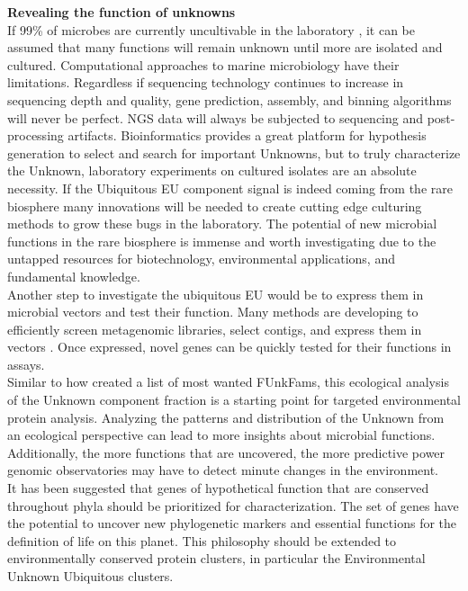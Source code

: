 \textbf{Revealing the function of unknowns}\\

If 99\% of microbes are currently uncultivable in the laboratory \citep{Barer_2015}, it can be assumed that many functions will remain unknown until more are isolated and cultured. Computational approaches to marine microbiology have their limitations. Regardless if sequencing technology continues to increase in sequencing depth and quality, gene prediction, assembly, and binning algorithms will never be perfect. NGS data will always be subjected to sequencing and post-processing artifacts. Bioinformatics provides a great platform for hypothesis generation to select and search for important Unknowns, but to truly characterize the Unknown, laboratory experiments on cultured isolates are an absolute necessity. If the Ubiquitous EU component signal is indeed coming from the rare biosphere many innovations will be needed to create cutting edge culturing methods to grow these bugs in the laboratory. The potential of new microbial functions in the rare biosphere is immense and worth investigating due to the untapped resources for biotechnology, environmental applications, and fundamental knowledge. \\

Another step to investigate the ubiquitous EU would be to express them in microbial vectors and test their function. Many methods are developing to efficiently screen metagenomic libraries, select contigs, and express them in vectors \citep{Leis_2013}. Once expressed, novel genes can be quickly tested for their functions in assays.\\

Similar to how \cite{Wyman_2017}  created a list of most wanted FUnkFams, this ecological analysis of the Unknown component fraction is a starting point for targeted environmental protein analysis. Analyzing the patterns and distribution of the Unknown from an ecological perspective can lead to more insights about microbial functions. Additionally, the more functions that are uncovered, the more predictive power genomic observatories may have to detect minute changes in the environment.\\

It has been suggested that genes of hypothetical function that are conserved throughout phyla should be prioritized for characterization\citep{Galperin_2004, Hanson_2010}. The  set of genes have the potential to uncover new phylogenetic markers and essential functions for the definition of life on this planet. This philosophy should be extended to environmentally conserved protein clusters, in particular the Environmental Unknown Ubiquitous clusters.\\
